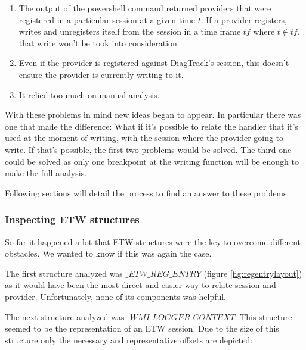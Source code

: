 \begin{enumerate}
\setlength\itemsep{0.05em}
  \item The output of the powershell command returned providers that were registered in a particular session at a given time $t$. If a provider registers, writes and unregisters itself from the session in a time frame $tf$ where $t \not\in tf$, that write won't be took into consideration.
  \item Even if the provider is registered against DiagTrack's session, this doesn't ensure the provider is currently writing to it.
  \item It relied too much on manual analysis.
\end{enumerate}

With these problems in mind new ideas began to appear. In particular there was one that made the difference: What if it's possible to relate the handler that it's used at the moment of writing, with the session where the provider going to write. If that's possible, the first two problems would be solved. The third one could be solved as only one breakpoint at the writing function will be enough to make the full analysis. 

Following sections will detail the process to find an answer to these problems.


\subsubsection{\bfseries Inspecting ETW structures}
So far it happened a lot that ETW structures were the key to overcome different obstacles. We wanted to know if this was again the case. 

The first structure analyzed was $\_ETW\_REG\_ENTRY$ (figure \ref{fig:regentrylayout}) as it would have been the most direct and easier way to relate session and provider. Unfortunately, none of its components was helpful.

The next structure analyzed was $\_WMI\_LOGGER\_CONTEXT$. This structure seemed to be the representation of an ETW session. Due to the size of this structure only the necessary and representative offsets are depicted: 

